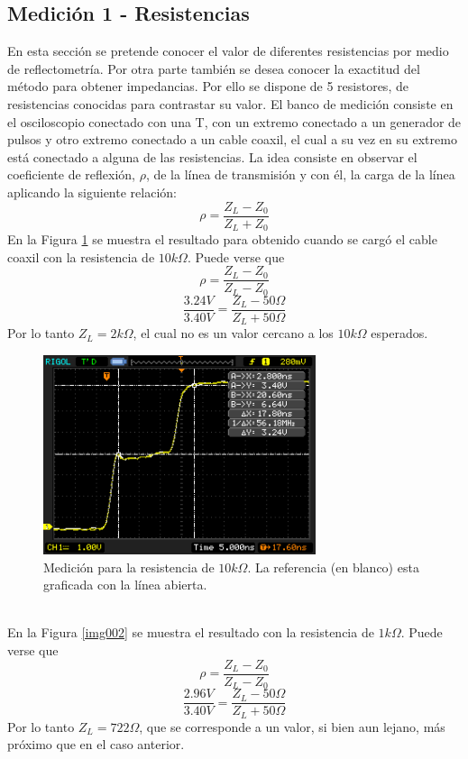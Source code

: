\documentclass[a4paper,10pt]{article}
\begin{document}
	\subsection{Medición 1 - Resistencias}
	\indent En esta sección se pretende conocer el valor de diferentes resistencias por medio de reflectometr\'ia. Por otra parte tambi\'en se desea conocer la exactitud del m\'etodo para obtener impedancias.
	Por ello se dispone de 5 resistores, de resistencias conocidas para contrastar su valor.
	El banco de medición consiste en el osciloscopio conectado con una T, con un extremo conectado a un generador de pulsos y otro extremo conectado a un cable coaxil, el cual a su vez en su extremo est\'a conectado a alguna de las resistencias.
	La idea consiste en observar el coeficiente de reflexión, $\rho$, de la l\'inea de transmisión y con \'el, la carga de la l\'inea aplicando la siguiente relaci\'on: $$\rho=\frac{Z_L-Z_0}{Z_L+Z_0}$$
	En la Figura \ref{img001} se muestra el resultado para obtenido cuando se carg\'o el cable coaxil con la resistencia de $10k\Omega$. Puede verse que $$\rho=\frac{Z_L-Z_0}{Z_L-Z_0}$$
	$$\frac{3.24V}{3.40V}=\frac{Z_L- 50\Omega}{Z_L+50\Omega}$$
	Por lo tanto $Z_L=2k\Omega$, el cual no es un valor cercano a los $10k\Omega$  esperados.\\
		\begin{figure}[!htb]
			\centering
			\includegraphics[width=8cm]
			{Imagenes/Res10k.png}
			\caption{Medici\'on para la resistencia de $10k\Omega$. La referencia (en blanco) esta graficada con la l\'inea abierta.}
			\label{img001} 
		\end{figure}\\
	En la Figura \ref{img002} se muestra el resultado con la resistencia de $1k\Omega$. Puede verse que $$\rho=\frac{Z_L-Z_0}{Z_L-Z_0}$$
	$$\frac{2.96V}{3.40V}=\frac{Z_L- 50\Omega}{Z_L+50\Omega}$$
	Por lo tanto $Z_L=722\Omega$, que se corresponde a un valor, si bien aun lejano, m\'as pr\'oximo que en el caso anterior.
\end{document}
